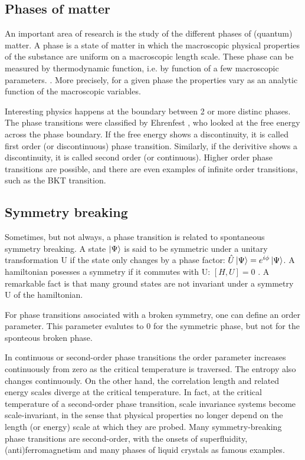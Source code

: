 \subsection{Phases of matter}

An important area of research is the study of the different phases of (quantum) matter. A phase is a state
of matter in which the macroscopic physical properties of the substance are uniform on a macroscopic length scale. These phase can be measured by thermodynamic function, i.e. by function of a few macroscopic parameters. \cite{Nishimori2011}. More precisely, for a given phase the properties vary as an analytic function of the macroscopic variables.

Interesting physics happens at the boundary between 2 or more distinc phases. The phase transitions were classified by Ehrenfest \cite{Jaeger1998}, who looked at the free energy across the phase boundary. If the free energy shows a discontinuity, it is called first order (or discontinuous) phase transition. Similarly, if the derivitive shows a discontinuity, it is called second order (or continuous). Higher order phase transitions are possible, and there are even examples of infinite order transitions, such as the BKT transition.

\subsection{Symmetry breaking}

Sometimes, but not always, a phase transition is  related to spontaneous symmetry breaking. A state $\ket{\Psi}$ is said to be symmetric under a unitary transformation U if the state only changes by a phase factor: $ \hat{U} \ket{\Psi} = e^{i \phi} \ket{\Psi} $. A hamiltonian posesses a symmetry if it commutes with U: $ [H,U]=0$  \cite{Beekman2019}. A remarkable fact is that many ground states are not invariant under a symmetry U of the hamiltonian.

For phase transitions associated with a broken symmetry, one can define an order parameter. This parameter evalutes to 0 for the symmetric phase, but not for the sponteous broken phase.

In continuous or second-order phase transitions the order parameter increases continuously from zero as the critical temperature is traversed. The entropy also changes continuously. On the other hand, the correlation length and related energy scales diverge at the critical temperature. In fact, at the critical temperature of a second-order phase transition, scale invariance systems become scale-invariant, in the sense that physical properties no longer depend on the length (or energy) scale at which they are probed. Many symmetry-breaking phase transitions are second-order, with the onsets of superfluidity, (anti)ferromagnetism and many phases of liquid crystals as famous examples.\cite{Beekman2019}

